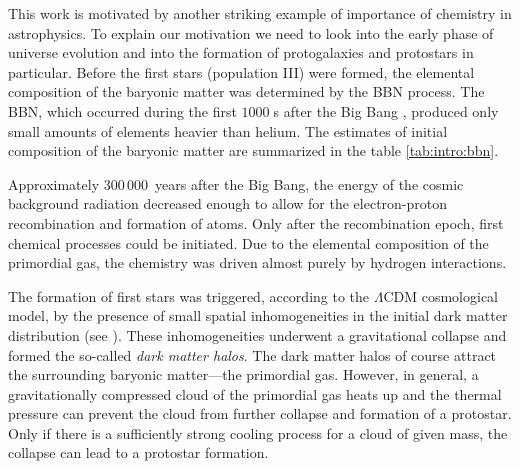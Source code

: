 This work is motivated by another striking example of importance of chemistry
in astrophysics. To explain our motivation we need to look into the early phase
of universe evolution and into the formation of protogalaxies and
protostars in particular. Before the first stars (population III) were formed,
the elemental composition of the baryonic matter was determined by the \ac{BBN}
process.
The \ac{BBN}, which occurred during the first $1000\;$s after the Big Bang
\citep{walker1991}, produced
only small amounts of elements heavier than helium. The estimates of initial
composition of the baryonic matter are summarized in the table
\ref{tab:intro:bbn}.
\begin{table}
    \caption{Measured relative abundances of the elements after the Big Bang
    nucleosynthesis \citep{yao2006}. The primordial density of ${}^3$He has
    not been determined from observations, but the observations of more recent
    astronomical objects and models suggest a value of the order
    $10^{-5}$ \citep{balser1999}. Other elements are expected to be present at
    relative concentrations below $10^{-10}$ \citep{vangioni2000}.}
    \label{tab:intro:bbn}
\end{table}


Approximately $300\,000$~years after the Big Bang, the
energy of the cosmic background radiation decreased enough to allow for the
electron-proton recombination and formation of atoms. Only after the
recombination epoch, first chemical processes could be initiated. Due to the
elemental composition of the primordial gas, the chemistry was driven almost
purely by hydrogen interactions. 

The formation of first stars was triggered, according to the $\Lambda$CDM
cosmological model, by the presence of small spatial inhomogeneities in
the initial dark matter distribution (see \cite{abel2002,glover2011}).
These inhomogeneities underwent a
gravitational collapse and formed the so-called {\em dark matter halos}.
The dark matter halos of course attract the surrounding baryonic matter---the
primordial gas.
However, in general, a gravitationally compressed cloud of the primordial
gas heats up and the thermal pressure can prevent the cloud from further
collapse and formation of a protostar.
Only if there is a sufficiently
strong cooling process for a cloud of given mass,
the collapse can lead to a protostar formation.

